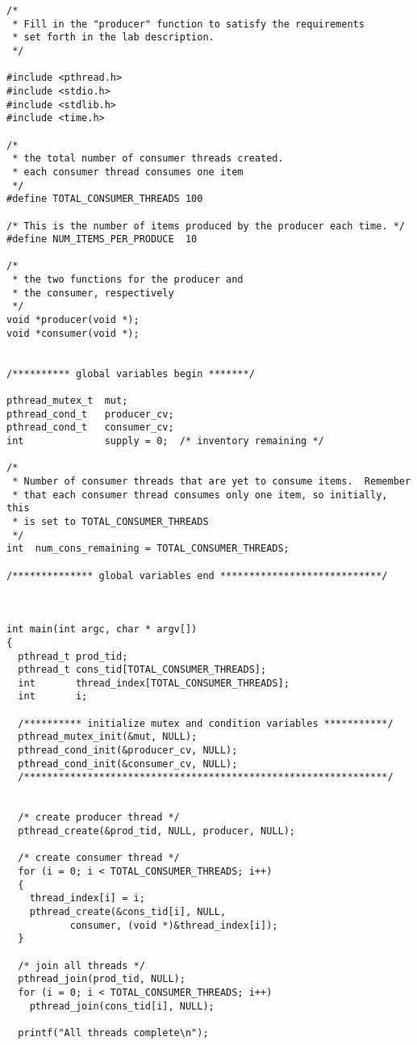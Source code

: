 \documentclass[11pt]{report}
\begin{document}
\begin{lstlisting}
/*
 * Fill in the "producer" function to satisfy the requirements 
 * set forth in the lab description.
 */

#include <pthread.h>
#include <stdio.h>
#include <stdlib.h>
#include <time.h>

/* 
 * the total number of consumer threads created.
 * each consumer thread consumes one item
 */
#define TOTAL_CONSUMER_THREADS 100

/* This is the number of items produced by the producer each time. */
#define NUM_ITEMS_PER_PRODUCE  10

/*
 * the two functions for the producer and 
 * the consumer, respectively
 */
void *producer(void *);    
void *consumer(void *);


/********** global variables begin *******/

pthread_mutex_t  mut;
pthread_cond_t 	 producer_cv; 	
pthread_cond_t	 consumer_cv;
int              supply = 0;  /* inventory remaining */

/* 
 * Number of consumer threads that are yet to consume items.  Remember
 * that each consumer thread consumes only one item, so initially, this 
 * is set to TOTAL_CONSUMER_THREADS
 */
int  num_cons_remaining = TOTAL_CONSUMER_THREADS;   

/************** global variables end ****************************/



int main(int argc, char * argv[])
{
  pthread_t prod_tid;
  pthread_t cons_tid[TOTAL_CONSUMER_THREADS];
  int       thread_index[TOTAL_CONSUMER_THREADS];
  int       i;

  /********** initialize mutex and condition variables ***********/
  pthread_mutex_init(&mut, NULL);
  pthread_cond_init(&producer_cv, NULL);
  pthread_cond_init(&consumer_cv, NULL);
  /***************************************************************/


  /* create producer thread */
  pthread_create(&prod_tid, NULL, producer, NULL);

  /* create consumer thread */
  for (i = 0; i < TOTAL_CONSUMER_THREADS; i++)
  {
    thread_index[i] = i;
    pthread_create(&cons_tid[i], NULL, 
		   consumer, (void *)&thread_index[i]);
  }

  /* join all threads */
  pthread_join(prod_tid, NULL);
  for (i = 0; i < TOTAL_CONSUMER_THREADS; i++)
    pthread_join(cons_tid[i], NULL);

  printf("All threads complete\n");


\end{lstlisting}
\end{document}
